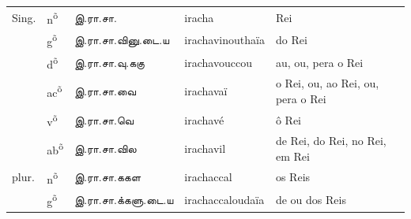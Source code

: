 \documentclass[12pt,a4paper]{scrbook}
\begin{document}
        
\begin{tabular}{lllll}
    
            
                Sing. &
                n\textsuperscript{õ} &
                இ.ரா.சா. &
                iracha &
                Rei \\
    
            
    
            
                 &
                g\textsuperscript{õ} &
                இ.ரா.சா.வினு.டை.ய &
                irachavinouthaïa &
                do Rei \\
    
            
    
            
                 &
                d\textsuperscript{õ} &
                இ.ரா.சா.வு.ககு &
                irachavouccou &
                au, ou, pera o Rei \\
    
            
    
            
                 &
                ac\textsuperscript{õ} &
                இ.ரா.சா.வை &
                irachavaï &
                o Rei, ou, ao Rei, ou, pera o Rei \\
    
            
    
            
                 &
                v\textsuperscript{õ} &
                இ.ரா.சா.வெ &
                irachavé &
                ô Rei \\
    
            
    
            
                 &
                ab\textsuperscript{õ} &
                இ.ரா.சா.வில &
                irachavil  &
                de Rei, do Rei, no Rei, em Rei \\
    
            
    
            
                plur. &
                n\textsuperscript{õ} &
                இ.ரா.சா.ககள &
                irachaccal &
                os Reis \\
    
            
    
            
                 &
                g\textsuperscript{õ} &
                இ.ரா.சா.க்களு.டை.ய &
                irachaccaloudaïa  &
                de ou dos Reis \\
    
            
    

\end{tabular}
\end{document}
